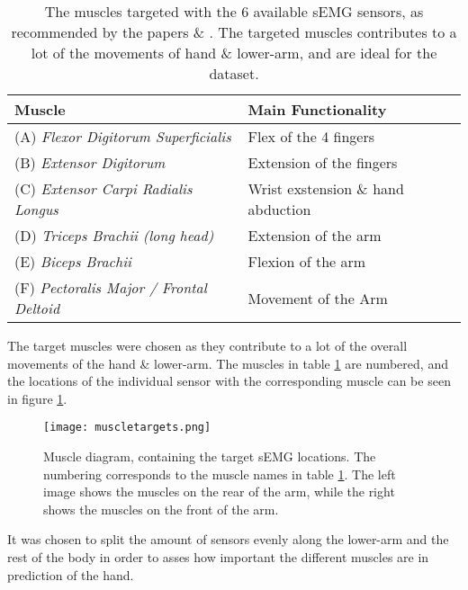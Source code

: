 \documentclass[../main.tex]{subfiles}
\begin{document}
\begin{table}[H]
\begin{center}
\begin{tabular}{ |l|l| } 
\hline
Muscle & Main Functionality \\ 
\hline
(A) \textit{Flexor Digitorum Superficialis} & Flex of the 4 fingers \\
(B) \textit{Extensor Digitorum} & Extension of the fingers \\
(C) \textit{Extensor Carpi Radialis Longus} & Wrist exstension \& hand abduction \\
(D) \textit{Triceps Brachii (long head)} & Extension of the arm \\
(E) \textit{Biceps Brachii} & Flexion of the arm \\
(F) \textit{Pectoralis Major / Frontal Deltoid} & Movement of the Arm \\
\hline
\end{tabular}
\caption{The muscles targeted with the 6 available sEMG sensors, as recommended by the papers  \cite{jarque2019} \& \cite{Batzianoulis2018}.
 The targeted muscles contributes to a lot of the movements of hand \& lower-arm, and are ideal for the dataset.
}
\label{tab:muscletargets}
\end{center}
\end{table}

The target muscles were chosen as they contribute to a lot of the overall movements of the hand \& lower-arm.
The muscles in table \ref{tab:muscletargets} are numbered, and the locations of the individual sensor with the corresponding muscle can be seen in figure \ref{fig:musclesensors}.

\begin{figure}[H]
\begin{center}
\texttt{[image: muscletargets.png]}
\caption{Muscle diagram, containing the target sEMG locations. The numbering corresponds to the muscle names in table \ref{tab:muscletargets}. The left image shows the muscles on the rear of the arm, while the right shows the muscles on the front of the arm.}
\label{fig:musclesensors}
\end{center}
\end{figure}

It was chosen to split the amount of sensors evenly along the lower-arm and the rest of the body in order to asses how important the different muscles are in prediction of the hand.
\end{document}

